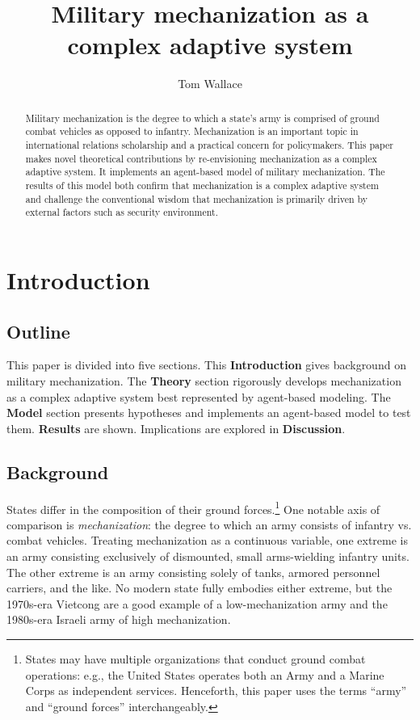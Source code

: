 \documentclass{article}
\title{Military mechanization as a complex adaptive system}
\author{Tom Wallace}
\begin{document}
\maketitle

\begin{abstract}

	Military mechanization is the degree to which a state's army is comprised of
	ground combat vehicles as opposed to infantry. Mechanization is an important topic 
	in international relations scholarship and a practical concern for
	policymakers. This paper makes novel theoretical contributions by
	re-envisioning mechanization as a complex adaptive system. It implements an
	agent-based model of military mechanization. The results of this model
	both confirm that mechanization is a complex adaptive system and
	challenge the conventional wisdom that mechanization is primarily driven
	by external factors such as security environment. 

\end{abstract}

\newpage

\section{Introduction}

\subsection{Outline}

This paper is divided into five sections. This \textbf{Introduction} gives
background on military mechanization. The \textbf{Theory} section rigorously
develops mechanization as a complex adaptive system best represented by
agent-based modeling. The \textbf{Model} section presents hypotheses and
implements an agent-based model to test them.
\textbf{Results} are shown. Implications are explored in \textbf{Discussion}.

\subsection{Background}

States differ in the composition of their ground forces.\footnote{States may 
have multiple organizations that
conduct ground combat operations: e.g., the United States operates both an Army
and a Marine Corps as independent services. Henceforth, this paper uses the
terms ``army'' and ``ground forces'' interchangeably.} One notable axis of comparison 
is \textit{mechanization}: the degree to which an army consists of infantry 
vs. combat vehicles. Treating mechanization as a continuous variable, 
one extreme is an army consisting exclusively of dismounted, small 
arms-wielding infantry units. The other extreme is an army consisting 
solely of tanks, armored personnel carriers, and the like.
No modern state fully embodies either extreme, but the 1970s-era Vietcong are
a good example of a low-mechanization army and the 1980s-era Israeli army of
high mechanization.
\end{document}
